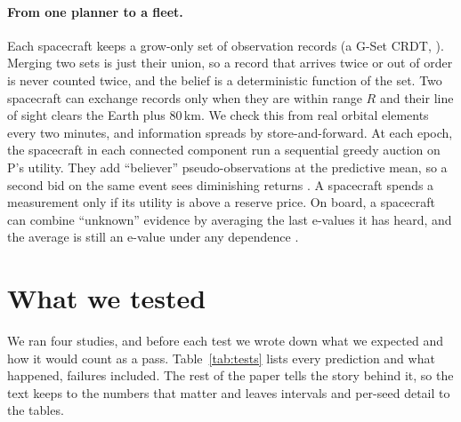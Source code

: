 \documentclass{jaa}
\begin{document}
\paragraph{From one planner to a fleet.} Each spacecraft keeps a grow-only set of observation records (a G-Set CRDT, \citealp{Shapiro2011}). Merging two sets is just their union, so a record that arrives twice or out of order is never counted twice, and the belief is a deterministic function of the set. Two spacecraft can exchange records only when they are within range $R$ and their line of sight clears the Earth plus 80\,km. We check this from real orbital elements every two minutes, and information spreads by store-and-forward. At each epoch, the spacecraft in each connected component run a sequential greedy auction on P's utility. They add ``believer'' pseudo-observations at the predictive mean, so a second bid on the same event sees diminishing returns \citep{Ginsbourger2010}. A spacecraft spends a measurement only if its utility is above a reserve price. On board, a spacecraft can combine ``unknown'' evidence by averaging the last e-values it has heard, and the average is still an e-value under any dependence \citep{VovkWang2021}.

\section{What we tested}\label{sec:tests}
We ran four studies, and before each test we wrote down what we expected and how it would count as a pass. Table~\ref{tab:tests} lists every prediction and what happened, failures included. The rest of the paper tells the story behind it, so the text keeps to the numbers that matter and leaves intervals and per-seed detail to the tables.
\end{document}
